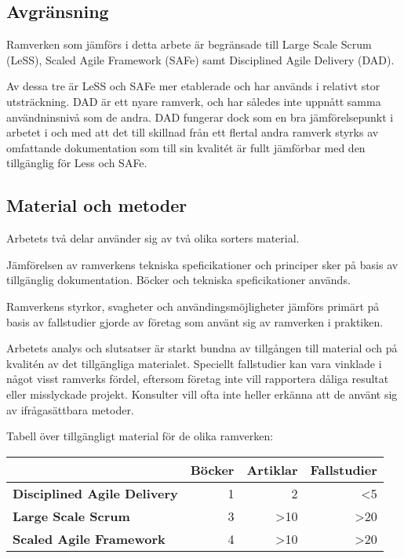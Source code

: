 \subsection{Avgränsning}

Ramverken som jämförs i detta arbete är begränsade till Large Scale Scrum (LeSS), Scaled Agile Framework (SAFe) samt Disciplined Agile Delivery (DAD).

Av dessa tre är LeSS och SAFe mer etablerade och har används i relativt stor utsträckning. DAD är ett nyare ramverk, och har således inte uppnått samma användninsnivå som de andra. DAD fungerar dock som en bra jämförelsepunkt i arbetet i och med att det till skillnad från ett flertal andra ramverk styrks av omfattande dokumentation som till sin kvalitét är fullt jämförbar med den tillgänglig för Less och SAFe. \cite{ask_matrix}


\subsection{Material och metoder}
Arbetets två delar använder sig av två olika sorters material.

Jämförelsen av ramverkens tekniska speficikationer och principer sker på basis av tillgänglig dokumentation. Böcker och tekniska speficikationer används.
\linebreak

Ramverkens styrkor, svagheter och användingsmöjligheter jämförs primärt på basis av fallstudier gjorde av företag som använt sig av ramverken i praktiken.



Arbetets analys och slutsatser är starkt bundna av tillgången till material och på kvalitén av det tillgängliga materialet. Speciellt fallstudier kan vara vinklade i något visst ramverks fördel, eftersom företag inte vill rapportera dåliga resultat eller misslyckade projekt. Konsulter vill ofta inte heller erkänna att de använt sig av ifrågasättbara metoder.


Tabell över tillgängligt material för de olika ramverken:

\begin{center}
\begin{tabular}{ >{\bfseries}l | r | r | r }
	  & Böcker & Artiklar & Fallstudier \\ \hline
	Disciplined Agile Delivery & 1 & 2 & <5 \\ \hline
	Large Scale Scrum & 3 & >10 & >20 \\ \hline
	Scaled Agile Framework & 4 & >10 & >20 \\ 
\end{tabular}
\end{center}

